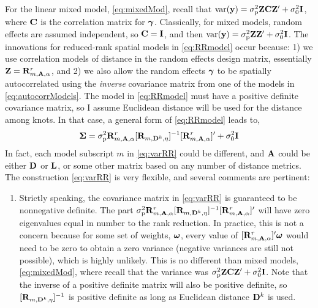 \documentclass[11pt, titlepage]{article}\usepackage[]{graphicx}\usepackage[]{color}
\begin{document}
\begin{spacing}{1.9}
\begin{flushleft}
For the linear mixed model, \ref{eq:mixedMod}, recall that $\textrm{var}(\mathbf{y}) = \sigma^2_\textrm{p}\mathbf{Z}\mathbf{C}\mathbf{Z}^{\prime} + \sigma^2_0\mathbf{I}$, where $\mathbf{C}$ is the correlation matrix for $\mbox{\boldmath $\gamma$}$.  Classically, for mixed models, random effects are assumed independent, so $\mathbf{C} = \mathbf{I}$, and then $\textrm{var}(\mathbf{y}) = \sigma^2_\textrm{p}\mathbf{Z}\mathbf{Z}^{\prime} + \sigma^2_0\mathbf{I}$.  The innovations for reduced-rank spatial models in \ref{eq:RRmodel} occur because: 1) we use correlation models of distance in the random effects design matrix, essentially $\mathbf{Z} = \mathbf{R}^r_{m,\mathbf{A},\alpha}$, and 2) we also allow the random effects $\mbox{\boldmath $\gamma$}$ to be spatially autocorrelated using the \emph{inverse} covariance matrix from one of the models in \ref{eq:autocorrModels}.  The model in \ref{eq:RRmodel} must have a positive definite covariance matrix, so I assume Euclidean distance will be used for the distance among knots.  In that case, a general form of \ref{eq:RRmodel} leads to,
\begin{equation} \label{eq:varRR}
				\mbox{\boldmath $\Sigma$} = \sigma^2_\textrm{p}\mathbf{R}^r_{m,\mathbf{A},\alpha}[\mathbf{R}_{m,\mathbf{D}^k,\eta}]^{-1}[\mathbf{R}^r_{m,\mathbf{A},\alpha}]^{\prime} + \sigma^2_0\mathbf{I}
\end{equation}
In fact, each model subscript $m$ in \ref{eq:varRR} could be different, and $\mathbf{A}$ could be either $\mathbf{D}$ or $\mathbf{L}$, or some other matrix based on any number of distance metrics.  The construction \ref{eq:varRR} is very flexible, and several comments are pertinent:
\begin{enumerate}
		\item Strictly speaking, the covariance matrix in \ref{eq:varRR} is guaranteed to be nonnegative definite. The part $\sigma^2_\textrm{p}\mathbf{R}^r_{m,\mathbf{A},\alpha}[\mathbf{R}_{m,\mathbf{D}^k,\eta}]^{-1}[\mathbf{R}^r_{m,\mathbf{A},\alpha}]^{\prime}$ will have zero eigenvalues equal in number to the rank reduction.  In practice, this is not a concern because for some set of weights, $\mbox{\boldmath $\omega$}$, every value of $[\mathbf{R}^r_{m,\mathbf{A},\alpha}]^{\prime}\mbox{\boldmath $\omega$}$ would need to be zero to obtain a zero variance (negative variances are still not possible), which is highly unlikely. This is no different than mixed models, \ref{eq:mixedMod}, where recall that the variance was $\sigma^2_\textrm{p}\mathbf{Z}\mathbf{C}\mathbf{Z}^{\prime} + \sigma_0^2\mathbf{I}$.  Note that the inverse of a positive definite matrix will also be positive definite, so $[\mathbf{R}_{m,\mathbf{D}^k,\eta}]^{-1}$ is positive definite as long as  Euclidean distance $\mathbf{D}^k$ is used.

\end{enumerate}
\end{flushleft}
\end{spacing}
\end{document}
